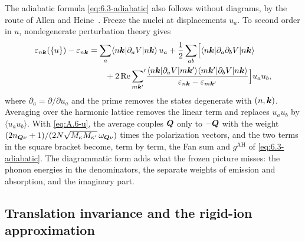 The adiabatic formula \cref{eq:6.3-adiabatic} also follows without diagrams, by the route of Allen and Heine~\cite{allen1976theory}. Freeze the nuclei at displacements $u_a$. To second order in $u$, nondegenerate perturbation theory gives
\begin{equation}
  \begin{split}
  \varepsilon_{n\bm{k}}(\{u\}) - \varepsilon_{n\bm{k}} &= \sum_a\langle n\bm{k}|\partial_aV|n\bm{k}\rangle\,u_a + \frac12\sum_{ab}\Bigl[\langle n\bm{k}|\partial_a\partial_bV|n\bm{k}\rangle\\
  &\qquad + 2\operatorname{Re}{\sum_{m\bm{k}'}}'\frac{\langle n\bm{k}|\partial_aV|m\bm{k}'\rangle\langle m\bm{k}'|\partial_bV|n\bm{k}\rangle}{\varepsilon_{n\bm{k}} - \varepsilon_{m\bm{k}'}}\Bigr]u_au_b ,
  \end{split}
  \label{eq:D.16-frozen}
\end{equation}
where $\partial_a = \partial/\partial u_a$ and the prime removes the states degenerate with $(n,\bm{k})$. Averaging over the harmonic lattice removes the linear term and replaces $u_au_b$ by $\langle u_au_b\rangle$. With \cref{eq:A.6-u}, the average couples $\bm{Q}$ only to $-\bm{Q}$ with the weight $(2n_{\bm{Q}\nu} + 1)/(2N\sqrt{M_\kappa M_{\kappa'}}\,\omega_{\bm{Q}\nu})$ times the polarization vectors, and the two terms in the square bracket become, term by term, the Fan sum and $g^{\mathrm{AH}}$ of \cref{eq:6.3-adiabatic}. The diagrammatic form adds what the frozen picture misses: the phonon energies in the denominators, the separate weights of emission and absorption, and the imaginary part.

\subsection*{Translation invariance and the rigid-ion approximation}

